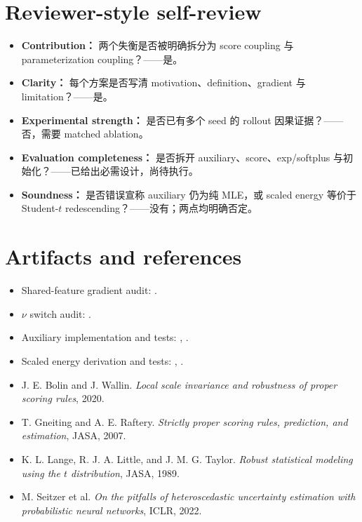 \documentclass[10pt]{article}
\begin{document}
\section*{Reviewer-style self-review}
\begin{itemize}
 \item \textbf{Contribution：} 两个失衡是否被明确拆分为 score coupling 与 parameterization coupling？——是。
 \item \textbf{Clarity：} 每个方案是否写清 motivation、definition、gradient 与 limitation？——是。
 \item \textbf{Experimental strength：} 是否已有多个 seed 的 rollout 因果证据？——否，需要 matched ablation。
 \item \textbf{Evaluation completeness：} 是否拆开 auxiliary、score、exp/softplus 与初始化？——已给出必需设计，尚待执行。
 \item \textbf{Soundness：} 是否错误宣称 auxiliary 仍为纯 MLE，或 scaled energy 等价于 Student-$t$ redescending？——没有；两点均明确否定。
\end{itemize}

\section*{Artifacts and references}
\small
\sloppy
\begin{itemize}
 \item Shared-feature gradient audit: .
 \item $\nu$ switch audit: .
 \item Auxiliary implementation and tests: , .
 \item Scaled energy derivation and tests: , .
 \item J. E. Bolin and J. Wallin. \emph{Local scale invariance and robustness of proper scoring rules}, 2020.
 \item T. Gneiting and A. E. Raftery. \emph{Strictly proper scoring rules, prediction, and estimation}, JASA, 2007.
 \item K. L. Lange, R. J. A. Little, and J. M. G. Taylor. \emph{Robust statistical modeling using the $t$ distribution}, JASA, 1989.
 \item M. Seitzer et al. \emph{On the pitfalls of heteroscedastic uncertainty estimation with probabilistic neural networks}, ICLR, 2022.
\end{itemize}
\end{document}

